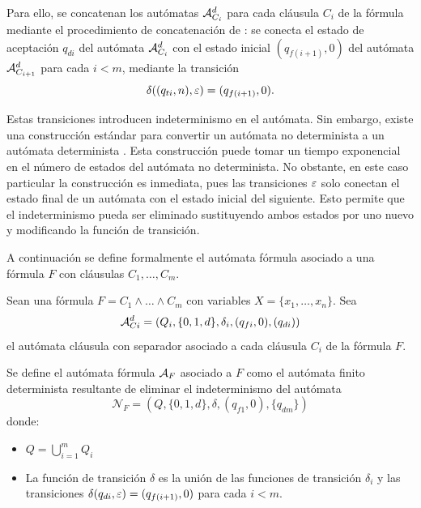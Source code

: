 Para ello, se concatenan los autómatas $\mathcal{A}_{C_i}^{d}$ para cada cláusula $C_i$ de la fórmula mediante el procedimiento de concatenación de \cite{automataTheory}: se conecta el estado de aceptación $q_{di}$ del autómata $\mathcal{A}_{C_i}^{d}$ con el estado inicial $(q_{f(i+1)}, 0)$ del autómata $\mathcal{A}_{C_{i+1}}^{d}$ para cada $i < m$, mediante la transición
$$
    \delta((q_{ti}, n), \varepsilon) = (q_{f(i+1)}, 0).
$$

Estas transiciones introducen indeterminismo en el autómata. Sin embargo, existe una construcción estándar para convertir un autómata no determinista a un autómata determinista \cite{automataTheory}. Esta construcción puede tomar un tiempo exponencial en el número de estados del autómata no determinista. No obstante, en este caso particular la construcción es inmediata, pues las transiciones $\varepsilon$ solo conectan el estado final de un autómata con el estado inicial del siguiente. Esto permite que el indeterminismo pueda ser eliminado sustituyendo ambos estados por uno nuevo y modificando la función de transición.

A continuación se define formalmente el autómata fórmula asociado a una fórmula $F$ con cláusulas $C_1, \ldots, C_m$.

\begin{definition}
    Sean una fórmula $F = C_1 \land \ldots \land C_m$ con variables $X = \{x_1, \ldots, x_n\}$. Sea
    $$
        \mathcal{A}_{Ci}^{d} = (Q_i, \{0, 1, d\}, \delta_i, (q_{fi}, 0), (q_{di}))
    $$
    el autómata cláusula con separador asociado a cada cláusula $C_i$ de la fórmula $F$.

    Se define el autómata fórmula $\mathcal{A}_{F}$ asociado a $F$ como el autómata finito determinista resultante de eliminar el indeterminismo del autómata
    $$
        \mathcal{N}_F = (Q, \{0, 1, d\}, \delta, (q_{f1}, 0), \{q_{dm}\})
    $$ donde:
    \begin{itemize}
        \item $Q = \bigcup_{i=1}^{m} Q_i$
        \item La función de transición $\delta$ es la unión de las funciones de transición $\delta_i$ y las transiciones $\delta(q_{di}, \varepsilon) = (q_{f(i+1)}, 0)$ para cada $i < m$.
    \end{itemize}
\end{definition}


